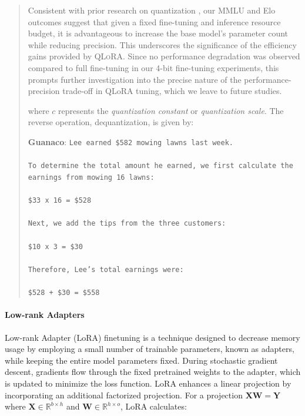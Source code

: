 \begin{quote}
Consistent with prior research on quantization \citep{dettmers2022case}, our MMLU and Elo outcomes suggest that given a fixed fine-tuning and inference resource budget, it is advantageous to increase the base model’s parameter count while reducing precision. This underscores the significance of the efficiency gains provided by \textsc{QLoRA}. Since no performance degradation was observed compared to full fine-tuning in our 4-bit fine-tuning experiments, this prompts further investigation into the precise nature of the performance-precision trade-off in QLoRA tuning, which we leave to future studies.

where $c$ represents the {\em quantization constant} or {\em quantization scale}. The reverse operation, dequantization, is given by:

    \textbf{Guanaco}: \texttt{Lee earned \$582 mowing lawns last week. \\ \\ To determine the total amount he earned, we first calculate the earnings from mowing 16 lawns: \\ \\  \$33 x 16 = \$528 \\ \\ Next, we add the tips from the three customers: \\  \\ \$10 x 3 = \$30 \\ \\ Therefore, Lee's total earnings were: \\ \\ \$528 + \$30 = \$558}
\end{quote}

\paragraph{Low-rank Adapters} Low-rank Adapter (LoRA) finetuning \citep{hu2021lora} is a technique designed to decrease memory usage by employing a small number of trainable parameters, known as adapters, while keeping the entire model parameters fixed. During stochastic gradient descent, gradients flow through the fixed pretrained weights to the adapter, which is updated to minimize the loss function. LoRA enhances a linear projection by incorporating an additional factorized projection. For a projection ${\mathbf{X} \mathbf{W} = \mathbf{Y}}$ where $\mathbf{X}\in  \mathbb{R}^{b\times h}$ and $\mathbf{W}\in  \mathbb{R}^{h\times o}$, LoRA calculates:

